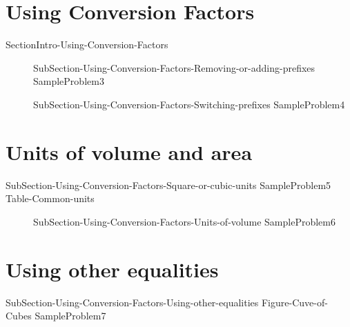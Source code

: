 \documentclass[main.tex]{subfiles}
\begin{document}
\section{Using Conversion Factors}{SectionIntro-Using-Conversion-Factors}
\sloppy\begin{description}
\item[]{SubSection-Using-Conversion-Factors-Removing-or-adding-prefixes}
{SampleProblem3}%
\item[]{SubSection-Using-Conversion-Factors-Switching-prefixes}
{SampleProblem4}%
\end{description}

\section{Units of volume and area}{SubSection-Using-Conversion-Factors-Square-or-cubic-units}
{SampleProblem5}%
{Table-Common-units}
\sloppy\begin{description}
\item[]{SubSection-Using-Conversion-Factors-Units-of-volume}
{SampleProblem6}%
\end{description}


\section{Using other equalities}{SubSection-Using-Conversion-Factors-Using-other-equalities}
{Figure-Cuve-of-Cubes}
{SampleProblem7}%
\end{document}
